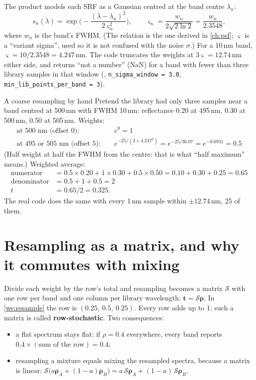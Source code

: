 \documentclass[11pt,a4paper,oneside,openany]{book}
\newcommand{\B}[1]{{\symbf{#1}}}
\newcommand{\B}[1]{{\bm{#1}}}
\newcommand{\vt}{\B{t}}
\begin{document}
The product models each SRF as a Gaussian centred at the band centre $\lambda_n$:
\[
  s_n(\lambda)=\exp\!\Big(-\frac{(\lambda-\lambda_n)^2}{2\varsigma_n^2}\Big),\qquad \varsigma_n=\frac{w_n}{2\sqrt{2\ln2}}=\frac{w_n}{2.3548},
\]
where $w_n$ is the band's FWHM. (The relation is the one derived in \cref{ch:psf}; $\varsigma$ is a ``variant sigma'', used so it is
not confused with the noise $\sigma$.) For a 10\,nm band, $\varsigma=10/2.3548=4.247$\,nm. The code truncates the weights at
$3\varsigma=12.74$\,nm either side, and returns ``not a number'' (NaN) for a band with fewer than three library samples in that
window (, \texttt{n\_sigma\_window = 3.0}, \texttt{min\_lib\_points\_per\_band = 3}).

\begin{worked}[label=we:resample]{A coarse resampling by hand}
Pretend the library had only three samples near a band centred at 500\,nm with FWHM 10\,nm: reflectance 0.20 at 495\,nm, 0.30 at
500\,nm, 0.50 at 505\,nm. Weights:
\begin{align*}
\text{at }500\text{ nm (offset 0)}: &\quad e^{0}=1\\
\text{at }495\text{ or }505\text{ nm (offset 5)}: &\quad e^{-25/(2\times4.247^2)}=e^{-25/36.07}=e^{-0.6931}=0.5
\end{align*}
(Half weight at half the FWHM from the centre: that is what ``half maximum'' means.) Weighted average:
\begin{align*}
\text{numerator} &= 0.5\times0.20+1\times0.30+0.5\times0.50=0.10+0.30+0.25=0.65\\
\text{denominator} &= 0.5+1+0.5=2\\
t &= 0.65/2=0.325 .
\end{align*}
The real code does the same with every 1\,nm sample within $\pm12.74$\,nm, 25 of them.
\end{worked}

\section{Resampling as a matrix, and why it commutes with mixing}

Divide each weight by the row's total and resampling becomes a matrix $\mathcal S$ with one row per band and one column per library
wavelength: $\vt=\mathcal S\B\rho$. In \cref{we:resample} the row is $(0.25,\ 0.5,\ 0.25)$. Every row adds up to 1; such a matrix is
called \textbf{row-stochastic}. Two consequences:
\begin{itemize}
\item a flat spectrum stays flat: if $\rho=0.4$ everywhere, every band reports $0.4\times(\text{sum of the row})=0.4$;
\item resampling a mixture equals mixing the resampled spectra, because a matrix is linear:
  $\mathcal S\big(a\B\rho_A+(1-a)\B\rho_B\big)=a\,\mathcal S\B\rho_A+(1-a)\,\mathcal S\B\rho_B$.
\end{itemize}
\end{document}
